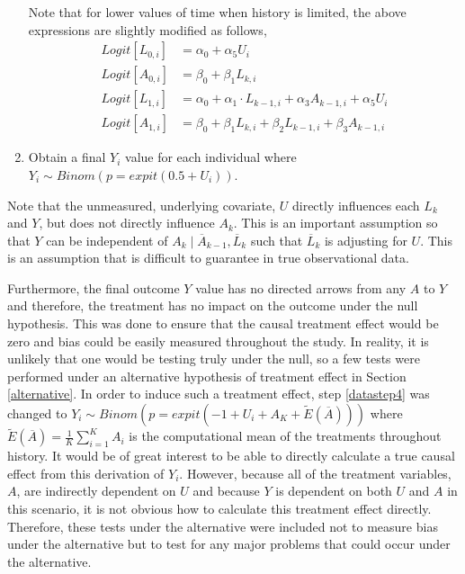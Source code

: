 \begin{enumerate}
Note that for lower values of time when history is limited, the above expressions are slightly modified as follows, 
\begin{align} 
Logit[L_{0,i}] &= \alpha_0 + \alpha_5 U_i\\ 
Logit[A_{0,i}] &= \beta_0 + \beta_1 L_{k,i} \\
Logit[L_{1,i}] &= \alpha_0 + \alpha_1 \cdot L_{k-1,i} + \alpha_3 A_{k-1,i}  + \alpha_5 U_i\\ 
Logit[A_{1,i}] &= \beta_0 + \beta_1 L_{k,i} + \beta_2 L_{k-1,i} + \beta_3 A_{k-1,i} 
\end{align} 
\item Obtain a final $Y_i$ value for each individual where $Y_i \sim Binom(p=expit(0.5+U_i))$.  \label{datastep4} 
\end{enumerate} 

Note that the unmeasured, underlying covariate, $U$ directly influences each $L_k$ and $Y$, but does not directly influence $A_k$.  This is an important assumption so that $Y$ can be independent of $A_k \mid \overline{A}_{k-1}, \overline{L}_k$ such that $\overline{L}_k$ is adjusting for $U$.  This is an assumption that is difficult to guarantee in true observational data.  

Furthermore, the final outcome $Y$ value has no directed arrows from any $A$ to $Y$ and therefore, the treatment has no impact on the outcome under the null hypothesis.  This was done to ensure that the causal treatment effect would be zero and bias could be easily measured throughout the study.  In reality, it is unlikely that one would be testing truly under the null, so a few tests were performed under an alternative hypothesis of treatment effect in Section \ref{alternative}.  In order to induce such a treatment effect, step \ref{datastep4} was changed to $Y_i \sim Binom(p = expit(-1+U_i + A_K + \tilde{E}(\overline{A})))$ where $\tilde{E}(\overline{A}) = \frac{1}{K} \sum_{i=1}^K A_i $ is the computational mean of the treatments throughout history.  It would be of great interest to be able to directly calculate a true causal effect from this derivation of $Y_i$.  However, because all of the treatment variables, $A$, are indirectly dependent on $U$ and because $Y$ is dependent on both $U$ and $A$ in this scenario, it is not obvious how to calculate this treatment effect directly.  Therefore, these tests under the alternative were included not to measure bias under the alternative but to test for any major problems that could occur under the alternative.  

